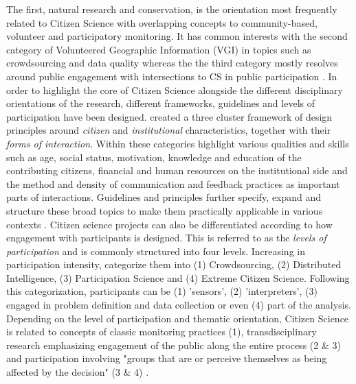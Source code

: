 The first, natural research and conservation, is the orientation most frequently related to Citizen Science with overlapping concepts to community-based, volunteer and participatory monitoring. It has common interests with the second category of Volunteered Geographic Information (VGI) in topics such as crowdsourcing and data quality whereas the the third category mostly resolves around public engagement with intersections to CS in public participation \autocite{kullenbergWhatCitizenScience2016}. In order to highlight the core of Citizen Science alongside the different disciplinary orientations of the research, different frameworks, guidelines and levels of participation have been designed.\autocite{kirschkeCitizenScienceProjects2022} created a three cluster framework of design principles around \textit{citizen} and \textit{institutional} characteristics, together with their \textit{forms of interaction}. Within these categories \autocite{kirschkeCitizenScienceProjects2022} highlight various qualities and skills such as age, social status, motivation, knowledge and education of the contributing citizens, financial and human resources on the institutional side and the method and density of communication and feedback practices as important parts of interactions. Guidelines and principles further specify, expand and structure these broad topics to make them practically applicable in various contexts \autocite{citizenscience.govBasicStepsYour,escaTenPrinciplesCitizen2015,escaECSACharacteristicsCitizen2020,EUCitizenScience2023,fraislCitizenScienceEnvironmental2022,garciaFindingWhatYou2021,minkmanCitizenScienceWater2015,pocockStrategicFrameworkSupport,skarlatidouWhatVolunteersWant2019}. Citizen science projects can also be differentiated according to how engagement with participants is designed. This is referred to as the \textit{levels of participation} and is commonly structured into four levels. Increasing in participation intensity, \autocite{buckinghamshumGlobalParticipatoryPlatform2012} categorize them into (1) Crowdsourcing, (2) Distributed Intelligence, (3) Participation Science and (4) Extreme Citizen Science. Following this categorization, participants can be (1) 'sensors', (2) 'interpreters', (3) engaged in problem definition and data collection or even (4) part of the analysis. 
Depending on the level of participation and thematic orientation, Citizen Science is related to concepts of classic monitoring practices (1), transdisciplinary research emphasizing engagement of the public along the entire process (2 \& 3) and participation involving "groups that are or perceive themselves as being affected by the decision" (3 \& 4) \autocites{buckinghamshumGlobalParticipatoryPlatform2012}{conradReviewCitizenScience2011}{minkmanCitizenScienceWater2015}[1]{rennParticipatoryProcessesDesigning2006}. 

